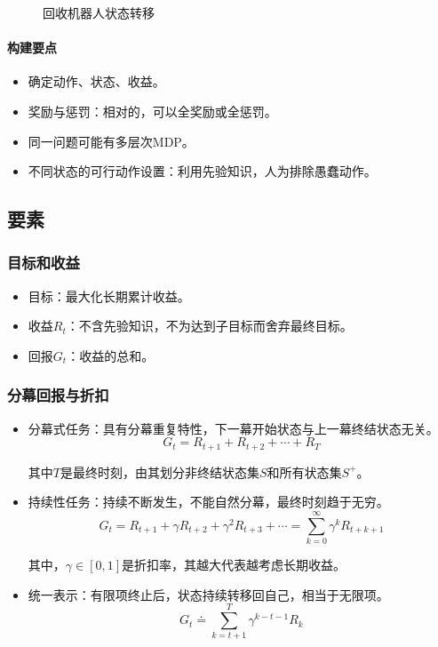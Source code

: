 \documentclass[
12pt, %
a4paper, 
oneside, %
headinclude,footinclude, %
]{scrartcl}
\begin{document}
\begin{figure}[H]
\centering
{} \quad
{}
\caption[回收机器人状态转移]{回收机器人状态转移}
\end{figure}
\paragraph{构建要点}
\begin{itemize}
\item 确定动作、状态、收益。
\item 奖励与惩罚：相对的，可以全奖励或全惩罚。
\item 同一问题可能有多层次MDP。
\item 不同状态的可行动作设置：利用先验知识，人为排除愚蠢动作。
\end{itemize}
\subsection{要素}
\subsubsection{目标和收益}
\begin{itemize}
\item 目标：最大化长期累计收益。
\item 收益$ R_t $：不含先验知识，不为达到子目标而舍弃最终目标。
\item 回报$ G_t $：收益的总和。
\end{itemize}
\subsubsection{分幕回报与折扣}
\begin{itemize}
\item 分幕式任务：具有分幕重复特性，下一幕开始状态与上一幕终结状态无关。
$$ G_t = R_{t + 1} + R_{t + 2} + \cdots + R_T $$

其中$ T $是最终时刻，由其划分非终结状态集$ S $和所有状态集$ S^+ $。
\item 持续性任务：持续不断发生，不能自然分幕，最终时刻趋于无穷。
$$ G_t = R_{t + 1} + \gamma R_{t + 2} + \gamma^2 R_{t + 3} + \cdots = \sum_{k = 0}^{\infty} \gamma^k R_{t + k  +1} $$

其中，$ \gamma \in [0, 1] $是折扣率，其越大代表越考虑长期收益。
\item 统一表示：有限项终止后，状态持续转移回自己，相当于无限项。
$$ G_t \doteq \sum_{k = t + 1}^{T} \gamma^{k - t - 1} R_k $$
\end{itemize}
\end{document}

